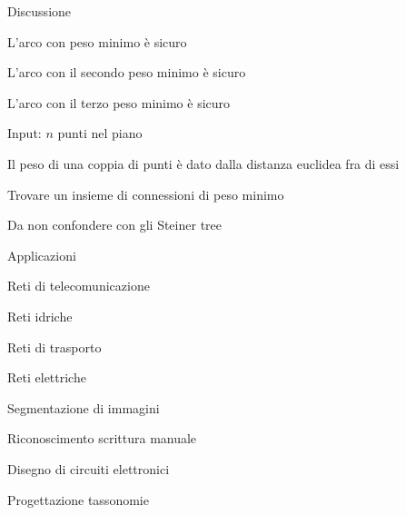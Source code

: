 \begin{frame}{Discussione}

\vspace{-9pt}
\begin{myboxtitle}
\BI
\item L’arco con peso minimo è sicuro
\item L’arco con il secondo peso minimo è sicuro
\item L’arco con il terzo peso minimo è sicuro
\EI
\end{myboxtitle}

\begin{myboxtitle}
\BI
\item Input: $n$ punti nel piano 
\item Il peso di una coppia di punti è dato dalla distanza euclidea fra di essi
\item Trovare un insieme di connessioni di peso minimo
\item Da non confondere con gli \alert{Steiner tree}
\EI
\end{myboxtitle}

\end{frame}

\begin{frame}{Applicazioni}

\vspace{-9pt}
\begin{myboxtitle}
\BI
\item Reti di telecomunicazione
\item Reti idriche
\item Reti di trasporto
\item Reti elettriche
\EI
\end{myboxtitle}

\begin{myboxtitle}
\BI
\item Segmentazione di immagini
\item Riconoscimento scrittura manuale
\item Disegno di circuiti elettronici
\item Progettazione tassonomie
\EI
\end{myboxtitle}

\end{frame}


